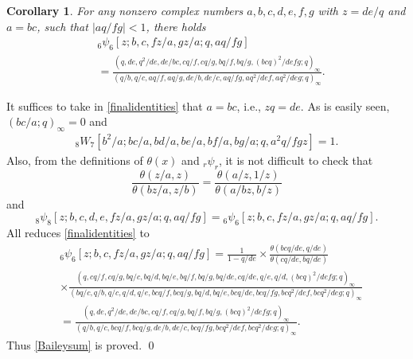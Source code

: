 \documentclass[xits,review,sort&compress]{elsarticle}
\newtheorem{tl}[dl]{Corollary}
\numberwithin{equation}{section}
\newcommand{\poq}[2]{(#1;q)_{#2}}
\def\pf{\noindent {\it Proof.} }
\begin{document}
\begin{tl}  For any nonzero complex numbers $a,b,c,d,e,f,g$ with $z=de/q$  and $a=bc$, such that $ |aq/fg|<1$, there holds
\begin{align}
   &{}_{6} \psi_{6}[z; b, c,  fz / a, gz / a ; q, aq / f g]\label{Baileysum}\\
&=\frac{\left(q,de,q^2/de, de/bc,cq/f,cq/g, bq/f,bq/g,(bcq)^{2}/defg ; q\right)_{\infty}}{(q/b,q/c,aq/f,aq/g,de/b,de/c, aq/fg, aq^2/def, aq^2/deg; q)_{\infty}}\nonumber.
\end{align}
\end{tl}
\pf It suffices to take in \eqref{finalidentities} that $a=bc$, i.e., $zq=de$. As is easily seen, $\poq{bc/a}{\infty}=0$ and
\begin{align*}
 {}_{8}W_{7}[b^{2} / a ; b c / a, b d / a, b e / a, b f / a, b g / a ; q, a^{2}q /fgz]=1.
\end{align*}
Also, from the definitions of $\theta(x)$ and ${}_r\psi_r$, it is not difficult to check that
$$
\frac{\theta(z/a,z)}{\theta(bz/a,z/b)}=
\frac{\theta(a/z,1/z)}{\theta(a/bz,b/z)}
$$
and
$$
{}_{8} \psi_{8}[z ; b, c, d, e, fz / a, gz / a ; q, aq / f g] ={}_{6} \psi_{6}[z ; b, c,  fz / a, gz / a ; q, aq / f g].
$$
All reduces \eqref{finalidentities} to
\begin{align*}
   &{}_{6} \psi_{6}[z ; b, c,  fz / a, gz / a ; q, aq / f g]=\frac{1}{1-q/de}\times
\frac{\theta(bcq/de,q/de)}{\theta(cq/de,bq/de)}\\&\times\frac{\left(q,cq/f,cq/g, bq/c,bq/d,bq/e,bq/f,bq/g,bq/de, cq/de, q/ e, q/d, (bcq)^{2} / defg ; q\right)_{\infty}}{(bq/c,q/b,q/c,q/d,q/e,bcq/f,bcq/g,bq/d, bq/e, bcq /de,  bcq/fg, bcq^2/ def, bcq^2/deg ; q)_{\infty}}\nonumber\\
&=\frac{\left(q,de,q^2/de, de/bc,cq/f,cq/g, bq/f,bq/g,(bcq)^{2}/defg ; q\right)_{\infty}}{(q/b,q/c,bcq/f,bcq/g,de/b,de/c, bcq/fg, bcq^2/ def, bcq^2/deg; q)_{\infty}}\nonumber.
\end{align*}
Thus  \eqref{Baileysum} is proved.
\qed
\end{document}

